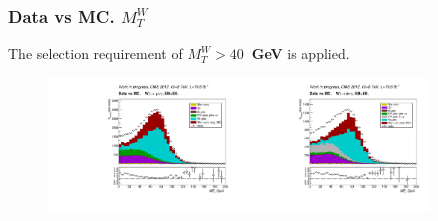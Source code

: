\begin{frame}\frametitle{Data vs MC. $M_T^W$}
\scriptsize
The selection requirement of {\bfseries{$M_T^W>40$~GeV}} is applied.
\begin{figure}[htb]
  \begin{center}
   \includegraphics[width=0.45\textwidth]{../figs/figs_v11/MUON_WGamma/PrepareYields/c_TotalDATAvsMC_EtaCommon__WMtVERY_PRELIMINARY.pdf}\includegraphics[width=0.45\textwidth]{../figs/figs_v11/ELECTRON_WGamma/PrepareYields/c_TotalDATAvsMC_EtaCommon__WMtVERY_PRELIMINARY.pdf}
  \label{fig:DATAvsMC_WMt}
  \end{center}
\end{figure}
\end{frame}

